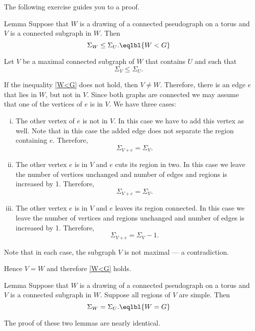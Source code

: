 The following exercise guides you to a proof.














\begin{thm}{Lemma}\label{lem:W<G}
Suppose that $W$ is a drawing of a connected pseudograph on a torus and $V$ is a connected subgraph in $W$.
Then 
\[\Sigma_W\le \Sigma_U.\eqlbl{W<G}\]
\end{thm}

 Let $V$ be a maximal connected subgraph of $W$ that contains $U$ and such that 
\[\Sigma_V\le \Sigma_U.\]

If the inequality \ref{W<G} does not hold, then $V\ne W$.
Therefore, there is an edge $e$ that lies in $W$, but not in $V$.
Since both graphs are connected we may assume that one of the vertices of $e$ is in $V$.
We have three cases:
\begin{enumerate}[(i)]
\item The other vertex of $e$ is not in $V$.
In this case we have to add this vertex as well.
Note that in this case the added edge does not separate the region containing $e$.
Therefore,
\[\Sigma_{V+e}=\Sigma_{V}.\]
\item The other vertex $e$ is in $V$ and $e$ cuts its region in two.
In this case we leave the number of vertices unchanged and number of edges and regions is increased by 1.
Therefore, 
\[\Sigma_{V+e}=\Sigma_{V}.\] 
\item\label{p-q+r<p-q+r} The other vertex $e$ is in $V$ and $e$ leaves its region connected.
In this case we leave the number of vertices and regions unchanged and number of edges is increased by 1.
Therefore, 
\[\Sigma_{V+e}=\Sigma_{V}-1.\]
\end{enumerate}
Note that in each case, the subgraph $V$ is not maximal --- a contradiction.

Hence $V=W$ and therefore \ref{W<G} holds.
\qeds

\begin{thm}{Lemma}\label{lem:W=G}
Suppose that $W$ is a drawing of a connected pseudograph on a torus and $V$ is a connected subgraph in $W$.
Suppose all regions of $V$ are simple.
Then 
\[\Sigma_W= \Sigma_U.\eqlbl{W=G}\]
\end{thm}

The proof of these two lemmas are nearly identical.

